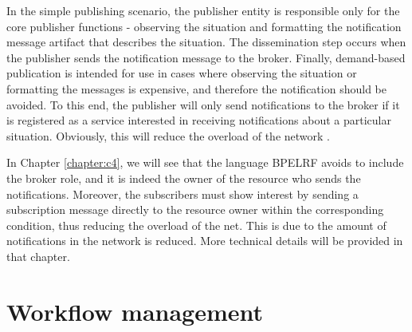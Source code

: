In the simple publishing scenario, the publisher entity is responsible only for the core publisher
functions - observing the situation and formatting
the notification message artifact that describes
the situation. The dissemination step occurs 
when the publisher sends the notification message to the
broker. Finally,
demand-based publication is intended for use in
cases where observing the situation or formatting the messages is expensive,
and therefore the notification should be avoided. To this end, the publisher
will only send notifications to the broker if it is registered as a service
interested in receiving notifications about a particular situation. Obviously, this
will reduce the overload of the network \cite{WSNstandard}. 

In Chapter \ref{chapter:c4}, we will see that the language BPELRF avoids to include the broker role, and
it is indeed the owner of the resource who sends the notifications. Moreover, the subscribers
must show interest by sending a subscription message directly to the resource owner within
the corresponding condition, thus reducing the overload of the net. This is due to the amount of notifications
in the network is reduced. More technical details will be provided in that chapter.


\section{Workflow management}

